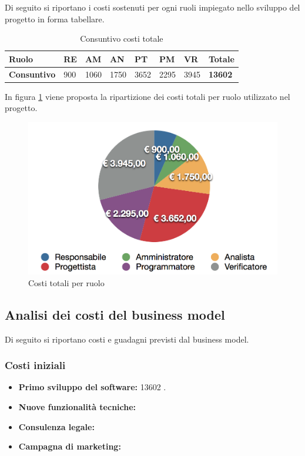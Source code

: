 Di seguito si riportano i costi sostenuti per ogni ruoli impiegato nello sviluppo del progetto in forma tabellare.

\begin{table}[H]
\caption{Consuntivo costi totale}
\label{costiTotaliConsuntivo}
\centering
\begin{tabular}{|p{3cm} | p{1cm}|p{1cm}| p{1cm}| p{1cm}| p{1cm}| p{1cm}| p{1cm}|}
\hline
\textbf{Ruolo}           & RE   &   AM  &   AN  &  PT  &  PM  &  VR  &  Totale      \\
\hline
\textbf{Consuntivo} 		& 900  &  1060 &  1750 & 3652 & 2295 & 3945 & \textbf{13602} \\
\hline
\end{tabular}
\end{table}

In figura \ref{costiTotPerRuoloCons} viene proposta la ripartizione dei costi totali per ruolo utilizzato nel progetto.

\begin{figure}[h]
\centering
\includegraphics[scale=0.25]{images/cap6/costiPerRuoloConsuntivo.png} %
\caption{Costi totali per ruolo}
\label{costiTotPerRuoloCons}
\end{figure}


\newpage

\subsection{Analisi dei costi del business model}

Di seguito si riportano costi e guadagni previsti dal business model.

\subsubsection{Costi iniziali}
\begin{itemize}
	\item \textbf{Primo sviluppo del software:} 13602 \EUR.
	\item \textbf{Nuove funzionalità tecniche:} 
	\item \textbf{Consulenza legale:} 
	\item \textbf{Campagna di marketing:} 
\end{itemize}



